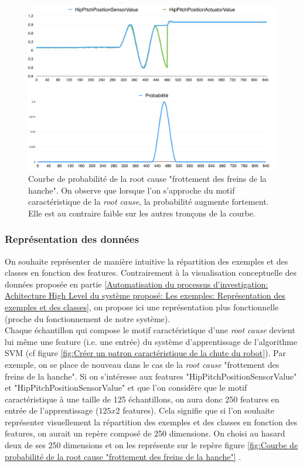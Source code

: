 \begin{figure}[h]
	\centering\includegraphics[width=12cm]{images/proba_motif.png}
	\caption[Courbe de probabilité de la root cause "frottement des freins de la hanche"]{Courbe de probabilité de la root cause "frottement des freins de la hanche".  On observe que lorsque l'on s'approche du motif caractéristique de la \emph{root cause}, la probabilité augmente fortement. Elle est au contraire faible sur les autres tronçons de la courbe.}
	\label{fig:Représentation de la répartition des exemples et des classes en fonction des features, approche fonctionnelle}
\end{figure}

\subsubsection{Représentation des données}
\label{Automatisation du processus d'investigation: Reconnaissance de motifs: Représentation des données}
On souhaite représenter de manière intuitive la répartition des exemples et des classes en fonction des features. Contrairement à la visualisation conceptuelle des données proposée en partie \ref{Automatisation du processus d'investigation: Achitecture High Level du système proposé: Les exemples: Représentation des exemples et des classes}, on propose ici une représentation plus fonctionnelle (proche du fonctionnement de notre système). \\
Chaque échantillon qui compose le motif caractéristique d'une \emph{root cause} devient lui même une feature (i.e. une entrée) du système d'apprentissage de l'algorithme SVM (cf figure \ref{fig:Créer un patron caractéristique de la chute du robot}). Par exemple, on se place de nouveau dans le cas de la \emph{root cause} "frottement des freins de la hanche". Si on s'intéresse aux features "HipPitchPositionSensorValue" et "HipPitchPositionSensorValue" et que l'on considère que le motif caractéristique à une taille de 125 échantillons, on aura donc 250 features en entrée de l'apprentissage ($125x2$ features). Cela signifie que si l'on souhaite représenter visuellement la répartition des exemples et des classes en fonction des features, on aurait un repère composé de 250 dimensions. On choisi au hasard deux de ses 250 dimensions et on les représente sur le repère figure 	\ref{fig:Courbe de probabilité de la root cause "frottement des freins de la hanche"} .

